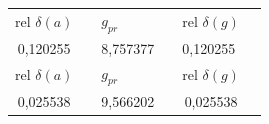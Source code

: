 \documentclass[a4paper,12pt]{article}
\begin{document}
\begin{table}[]
\begin{tabular}{@{}|c|l|l|l|l|l|@{}}
\multicolumn{1}{l}{rel $\delta(a)$}          &                            & $g_{pr}$                                      &                          & rel $\delta(g)$                               &                        \\
\multirow{3}{*}{0,120255}                    &                            & \multicolumn{1}{r}{\multirow{3}{*}{8,757377}} &                          & \multirow{3}{*}{0,120255}                     &                        \\\hline
                                             &                            & \multicolumn{1}{r}{}                          &                          &                                               &                        \\
                                             &                            & \multicolumn{1}{r}{}                          &                          &                                               &                        \\\hline
\multicolumn{1}{l}{rel $\delta(a)$}          &                            & $g_{pr}$                                      &                          & rel $\delta(g)$                               &                        \\
\multirow{3}{*}{0,025538}                    &                            & \multirow{3}{*}{9,566202}                     &                          & \multicolumn{1}{c}{\multirow{3}{*}{0,025538}} &                        \\\hline
                                             &                            &                                               &                          & \multicolumn{1}{c}{}                          &                        \\
                                             &                            &                                               &                          & \multicolumn{1}{c}{}                          &\\                       
\hline
\end{tabular}
\end{table}
\newpage
\end{document}
